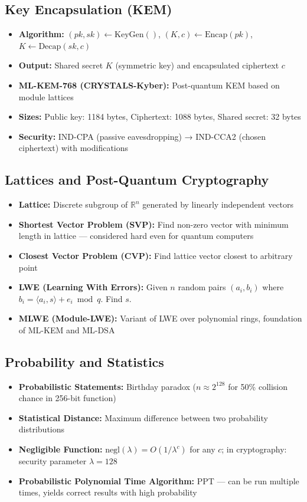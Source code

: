 \documentclass[11pt,a4paper,oneside]{book}
\begin{document}
\vspace{-0.2cm}\subsection{Key Encapsulation (KEM)}
\begin{itemize}
  \item \textbf{Algorithm:} $(pk, sk) \leftarrow \text{KeyGen}()$, $(K, c) \leftarrow \text{Encap}(pk)$, $K \leftarrow \text{Decap}(sk, c)$
  \item \textbf{Output:} Shared secret $K$ (symmetric key) and encapsulated ciphertext $c$
  \item \textbf{ML-KEM-768 (CRYSTALS-Kyber):} Post-quantum KEM based on module lattices
  \item \textbf{Sizes:} Public key: 1184 bytes, Ciphertext: 1088 bytes, Shared secret: 32 bytes
  \item \textbf{Security:} IND-CPA (passive eavesdropping) → IND-CCA2 (chosen ciphertext) with modifications
\end{itemize}
\vspace{-0.2cm}\subsection{Lattices and Post-Quantum Cryptography}
\begin{itemize}
  \item \textbf{Lattice:} Discrete subgroup of $\mathbb{R}^n$ generated by linearly independent vectors
  \item \textbf{Shortest Vector Problem (SVP):} Find non-zero vector with minimum length in lattice — considered hard even for quantum computers
  \item \textbf{Closest Vector Problem (CVP):} Find lattice vector closest to arbitrary point
  \item \textbf{LWE (Learning With Errors):} Given $n$ random pairs $(a_i, b_i)$ where $b_i = \langle a_i, s \rangle + e_i \bmod q$. Find $s$.
  \item \textbf{MLWE (Module-LWE):} Variant of LWE over polynomial rings, foundation of ML-KEM and ML-DSA
\end{itemize}
\vspace{-0.2cm}\subsection{Probability and Statistics}
\begin{itemize}
  \item \textbf{Probabilistic Statements:} Birthday paradox ($n \approx 2^{128}$ for 50\% collision chance in 256-bit function)
  \item \textbf{Statistical Distance:} Maximum difference between two probability distributions
  \item \textbf{Negligible Function:} $\text{negl}(\lambda) = O(1/\lambda^c)$ for any $c$; in cryptography: security parameter $\lambda = 128$
  \item \textbf{Probabilistic Polynomial Time Algorithm:} PPT — can be run multiple times, yields correct results with high probability
\end{itemize}
\end{document}
